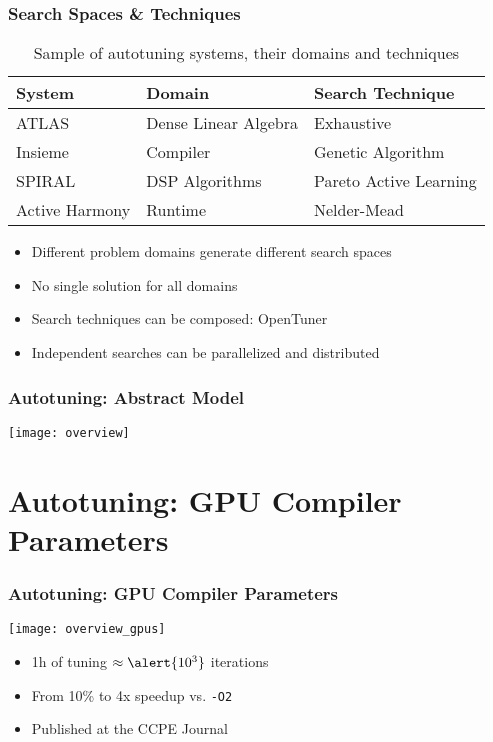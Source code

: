 \documentclass[10pt, compress, aspectratio=169]{beamer}
\begin{document}
\begin{frame}
    \frametitle{Search Spaces \& Techniques}
    \begin{table}[]
        \centering
        \begin{tabular}{@{}lll@{}}
            \toprule
            System & Domain & Search Technique \\ \midrule
            ATLAS & Dense Linear Algebra & Exhaustive \\
            Insieme & Compiler & Genetic Algorithm \\
            SPIRAL & DSP Algorithms & Pareto Active Learning \\
            Active Harmony & Runtime & Nelder-Mead \\ \bottomrule
        \end{tabular}
        \caption{Sample of autotuning systems, their domains and techniques}
    \end{table}

    \begin{itemize}
        \item Different \alert{problem domains} generate different \alert{search spaces}
        \item \alert{No single solution} for all domains
        \item Search techniques can be \alert{composed}: \alert{OpenTuner}
        \item Independent searches can be \alert{parallelized and distributed}
    \end{itemize}
\end{frame}

\begin{frame}
    \frametitle{Autotuning: Abstract Model}
    \begin{center}
        \texttt{[image: overview]}
    \end{center}
\end{frame}

\section{Autotuning: GPU Compiler Parameters}

\begin{frame}
    \frametitle{Autotuning: GPU Compiler Parameters}
    \begin{center}
        \texttt{[image: overview\_gpus]}
    \end{center}

    \begin{itemize}
        \item \alert{1h} of tuning $\approx \alert{10^3}$ \alert{iterations}
        \item From \alert{10\% to 4x speedup} vs. \texttt{-O2}
        \item \alert{Published at the CCPE Journal}
    \end{itemize}
\end{frame}
\end{document}
